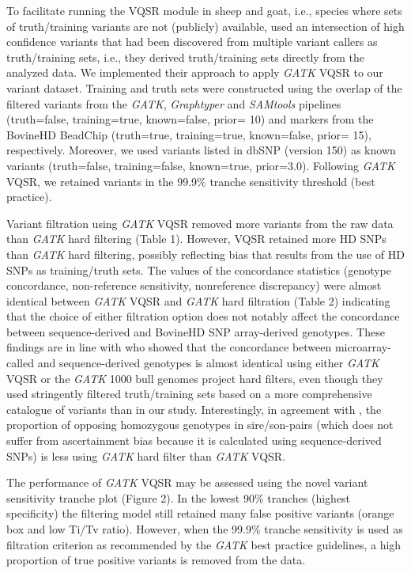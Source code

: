 \documentclass[../main.tex]{subfiles}
\begin{document}
\begin{flushleft}
To facilitate running the VQSR module in sheep and goat, i.e., species where sets of
truth/training variants are not (publicly) available, \citep{alberto2018convergent} used an
intersection of high confidence variants that had been discovered from multiple variant
callers as truth/training sets, i.e., they derived truth/training sets directly from the analyzed
data. We implemented their approach to apply \emph{GATK} VQSR to our variant dataset. Training
and truth sets were constructed using the overlap of the filtered variants from the \emph{GATK},
\emph{Graphtyper} and \emph{SAMtools} pipelines (truth=false, training=true, known=false, prior= 10) and
markers from the BovineHD BeadChip (truth=true, training=true, known=false, prior= 15),
respectively. Moreover, we used variants listed in dbSNP (version 150) as known variants
(truth=false, training=false, known=true, prior=3.0). Following \emph{GATK} VQSR, we retained
variants in the 99.9\% tranche sensitivity threshold (best practice).

\bigskip

Variant filtration using \emph{GATK} VQSR removed more variants from the raw data than \emph{GATK}
hard filtering (Table 1). However, VQSR retained more HD SNPs than \emph{GATK} hard filtering,
possibly reflecting bias that results from the use of HD SNPs as training/truth sets. The
values of the concordance statistics (genotype concordance, non-reference sensitivity, nonreference discrepancy) were almost identical between \emph{GATK} VQSR and \emph{GATK} hard
filtration (Table 2) indicating that the choice of either filtration option does not notably affect
the concordance between sequence-derived and BovineHD SNP array-derived genotypes.
These findings are in line with \citep{vander2018best} who showed that the concordance
between microarray-called and sequence-derived genotypes is almost identical using either
\emph{GATK} VQSR or the \emph{GATK} 1000 bull genomes project hard filters, even though they used
stringently filtered truth/training sets based on a more comprehensive catalogue of variants
than in our study. Interestingly, in agreement with \citep{vander2018best}, the proportion
of opposing homozygous genotypes in sire/son-pairs (which does not suffer from
ascertainment bias because it is calculated using sequence-derived SNPs) is less using
\emph{GATK} hard filter than \emph{GATK} VQSR.

\bigskip

The performance of \emph{GATK} VQSR may be assessed using the novel variant sensitivity
tranche plot (Figure 2). In the lowest 90\% tranches (highest specificity) the filtering model
still retained many false positive variants (orange box and low Ti/Tv ratio). However, when
the 99.9\% tranche sensitivity is used as filtration criterion as recommended by the \emph{GATK}
best practice guidelines, a high proportion of true positive variants is removed from the
data. 


\end{flushleft}
\end{document}
